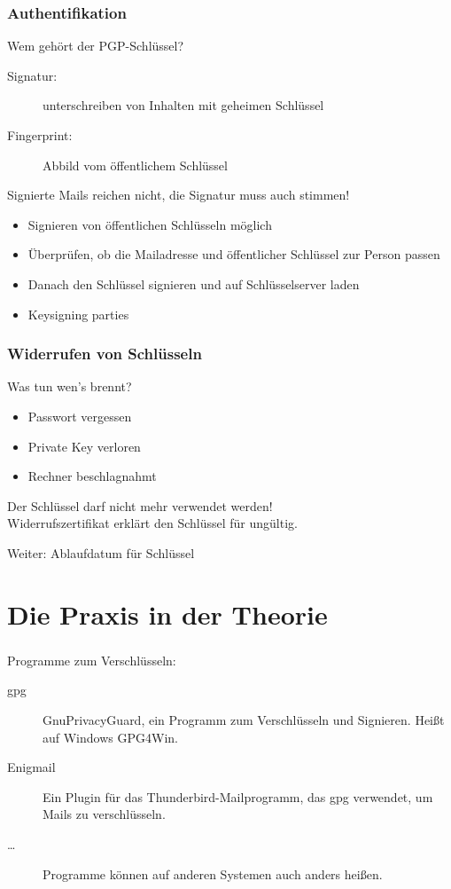 \documentclass[compress]{beamer}
\begin{document}
\begin{frame}
    \frametitle{Authentifikation}
    Wem gehört der PGP-Schlüssel?
    \begin{description}
        \item[Signatur:] unterschreiben von Inhalten mit geheimen Schlüssel
        \item[Fingerprint:] Abbild vom öffentlichem Schlüssel
    \end{description}
    Signierte Mails reichen nicht, die Signatur muss auch stimmen!
    \begin{itemize}
        \item Signieren von öffentlichen Schlüsseln möglich
        \item Überprüfen, ob die Mailadresse und öffentlicher Schlüssel zur Person passen
        \item Danach den Schlüssel signieren und auf Schlüsselserver laden
        \item Keysigning parties
    \end{itemize}
\end{frame}
\begin{frame}
    \frametitle{Widerrufen von Schlüsseln}
    Was tun wen's brennt?
    \begin{itemize}
        \item Passwort vergessen
        \item Private Key verloren
        \item Rechner beschlagnahmt
    \end{itemize}
    Der Schlüssel darf nicht mehr verwendet werden!\\[1em]

    \alert{Widerrufszertifikat} erklärt den Schlüssel für ungültig.

    Weiter: Ablaufdatum für Schlüssel
\end{frame}

\section{Die Praxis in der Theorie}
\label{sec-1-1-5}

\begin{frame}
  \frametitle{\insertsection}
  Programme zum Verschlüsseln:

  \begin{description}
  \item[gpg] \alert{G}nu\alert{P}rivacy\alert{G}uard, ein Programm zum
    Verschlüsseln und Signieren.  Heißt auf Windows \alert{GPG4Win}.
  \item[Enigmail] Ein Plugin für das Thunderbird-Mailprogramm, das gpg
    verwendet, um Mails zu verschlüsseln.
  \item[\ldots] Programme können auf anderen Systemen auch anders
    heißen.
  \end{description}

\end{frame}
\end{document}
